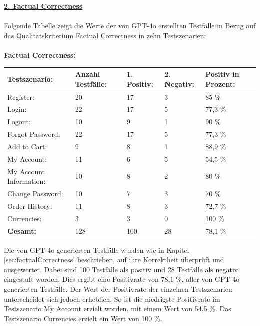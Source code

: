 \documentclass[12pt,toc=bib,toc=listof]{scrreprt}
\begin{document}
\noindent\textbf{\underline{2. Factual Correctness}}\\
\\
Folgende Tabelle zeigt die Werte der von GPT-4o erstellten Testfälle in Bezug auf das Qualitätskriterium \glqq Factual Correctness\grqq{} in zehn Testszenarien:\\
\\
\textbf{Factual Correctness:} 
\begin{table}[H]
 \begin{center}
\begin{tabularx}{\textwidth}{|X|X|X|X|X|}
\hline
\textbf{Testszenario:} & \textbf{Anzahl \newline Testfälle:} & \textbf{1. Positiv:} & \textbf{2. Negativ:}  & \textbf{Positiv in \newline Prozent:}\\ \hline
Register:  & 20 & 17 & 3 & 85 \%       \\ \hline
Login:  & 22 & 17 & 5 & 77,3 \%       \\ \hline
Logout:  & 10 & 9 & 1 & 90 \%       \\ \hline
Forgot \newline Password:  & 22 & 17 & 5 & 77,3 \%       \\ \hline
Add to Cart:  & 9 & 8 & 1 & 88,9 \%       \\ \hline
My Account:  & 11 & 6 & 5 & 54,5 \%       \\ \hline
My Account \newline Information:  & 10 & 8 & 2 & 80 \%       \\ \hline
Change \newline Password:  & 10 & 7 & 3 & 70 \%       \\ \hline
Order History:  & 11 & 8 & 3 & 72,7 \%       \\ \hline
Currencies: & 3 & 3 & 0 & 100 \% \\ \hline
\textbf{Gesamt:} & 128 & 100 & 28 & 78,1 \% \\ \hline

\end{tabularx}
\end{center}
\end{table}

\noindent Die von GPT-4o generierten Testfälle wurden wie in Kapitel \ref{sec:factualCorrectness} beschrieben, auf ihre Korrektheit überprüft und ausgewertet. Dabei sind 100 Testfälle als positiv und 28 Testfälle als negativ eingestuft worden. Dies ergibt eine Positivrate von 78,1 \%, aller von GPT-4o generierten Testfälle. Der Wert der Positivrate der einzelnen Testszenarien unterscheidet sich jedoch erheblich. So ist die niedrigste Positivrate im Testszenario \glqq My Account\grqq{} erzielt worden, mit einem Wert von 54,5 \%. Das Testszenario \glqq Currencies\grqq{} erzielt ein Wert von 100 \%.
\newpage
\end{document}
